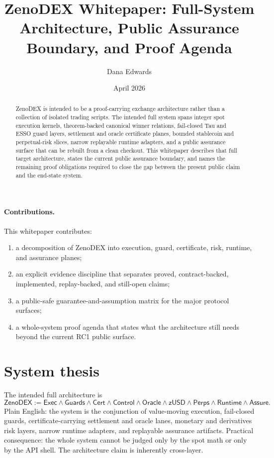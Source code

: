 \documentclass[10pt]{extarticle}
\title{ZenoDEX Whitepaper: Full-System Architecture, Public Assurance Boundary, and Proof Agenda}
\author{Dana Edwards}
\date{April 2026}
\newcommand{\Exec}{\mathsf{Exec}}
\newcommand{\Guards}{\mathsf{Guards}}
\newcommand{\Cert}{\mathsf{Cert}}
\newcommand{\Runtime}{\mathsf{Runtime}}
\newcommand{\Assure}{\mathsf{Assure}}
\begin{document}
\maketitle

\begin{abstract}
ZenoDEX is intended to be a proof-carrying exchange architecture rather than a
collection of isolated trading scripts. The intended full system spans integer
spot execution kernels, theorem-backed canonical winner relations, fail-closed
Tau and ESSO guard layers, settlement and oracle certificate planes, bounded
stablecoin and perpetual-risk slices, narrow replayable runtime adapters, and a
public assurance surface that can be rebuilt from a clean checkout. This
whitepaper describes that full target architecture, states the current public
assurance boundary, and names the remaining proof obligations required to close
the gap between the present public claim and the end-state system.
\end{abstract}

\paragraph{Contributions.}
This whitepaper contributes:
\begin{enumerate}
  \item a decomposition of ZenoDEX into execution, guard, certificate, risk,
  runtime, and assurance planes;
  \item an explicit evidence discipline that separates proved,
  contract-backed, implemented, replay-backed, and still-open claims;
  \item a public-safe guarantee-and-assumption matrix for the major protocol
  surfaces;
  \item a whole-system proof agenda that states what the architecture still
  needs beyond the current RC1 public surface.
\end{enumerate}

\section{System thesis}
The intended full architecture is
\[
\mathsf{ZenoDEX}
:= \Exec \wedge \Guards \wedge \Cert \wedge \mathsf{Control}
\wedge \mathsf{Oracle} \wedge \mathsf{zUSD} \wedge \mathsf{Perps}
\wedge \Runtime \wedge \Assure.
\]
Plain English: the system is the conjunction of value-moving execution,
fail-closed guards, certificate-carrying settlement and oracle lanes, monetary
and derivatives risk layers, narrow runtime adapters, and replayable assurance
artifacts.
Practical consequence: the whole system cannot be judged only by the spot math
or only by the API shell. The architecture claim is inherently cross-layer.
\end{document}
